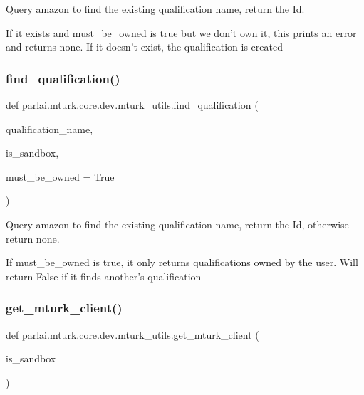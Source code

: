 \begin{DoxyVerb}Query amazon to find the existing qualification name, return the Id.

If it exists and must_be_owned is true but we don't own it, this prints an error and
returns none. If it doesn't exist, the qualification is created
\end{DoxyVerb}
 \mbox{\label{namespaceparlai_1_1mturk_1_1core_1_1dev_1_1mturk__utils_acd636315cbbf11cc5d9d641173e51586}} 
\subsubsection{\texorpdfstring{find\+\_\+qualification()}{find\_qualification()}}
{\footnotesize\ttfamily def parlai.\+mturk.\+core.\+dev.\+mturk\+\_\+utils.\+find\+\_\+qualification (\begin{DoxyParamCaption}\item[{}]{qualification\+\_\+name,  }\item[{}]{is\+\_\+sandbox,  }\item[{}]{must\+\_\+be\+\_\+owned = {\ttfamily True} }\end{DoxyParamCaption})}

\begin{DoxyVerb}Query amazon to find the existing qualification name, return the Id, otherwise
return none.

If must_be_owned is true, it only returns qualifications owned by the user. Will
return False if it finds another's qualification
\end{DoxyVerb}
 \mbox{\label{namespaceparlai_1_1mturk_1_1core_1_1dev_1_1mturk__utils_ad9e4ecfca00663796f26ca16a2778f29}} 
\subsubsection{\texorpdfstring{get\+\_\+mturk\+\_\+client()}{get\_mturk\_client()}}
{\footnotesize\ttfamily def parlai.\+mturk.\+core.\+dev.\+mturk\+\_\+utils.\+get\+\_\+mturk\+\_\+client (\begin{DoxyParamCaption}\item[{}]{is\+\_\+sandbox }\end{DoxyParamCaption})}

